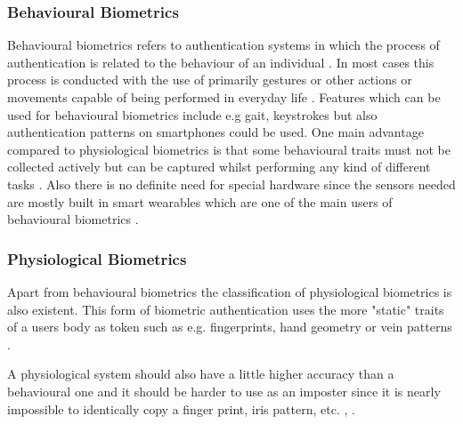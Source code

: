 \subsubsection{Behavioural Biometrics}
Behavioural biometrics refers to authentication systems in which the process of authentication is related to the behaviour of an individual \cite{bhattacharyya2009biometric}.
In most cases this process is conducted with the use of primarily gestures or other actions or movements capable of being performed in everyday life \cite{yampolskiy2008behavioural}.
Features which can be used for behavioural biometrics include e.g gait, keystrokes but also authentication patterns on smartphones could be used.
One main advantage compared to physiological biometrics is that some behavioural traits must not be collected actively but can be captured whilst performing any kind of different tasks \cite{yampolskiy2008behavioural}. 
Also there is no definite need for special hardware since the sensors needed are mostly built in smart wearables which are one of the main users of behavioural biometrics \cite{johnston2015smartwatch}.

\subsubsection{Physiological Biometrics}
Apart from behavioural biometrics the classification of physiological biometrics is also existent. 
This form of biometric authentication uses the more "static" traits of a users body as token such as e.g. fingerprints, hand geometry \cite{alsaadi2015physiological} or vein patterns \cite{faltaous2019vpid}.

A physiological system should also have a little higher accuracy than a behavioural one and it should be harder to use as an imposter since it is nearly impossible to identically copy a finger print, iris pattern, etc. \cite{koong2014user}, \cite{delac2004survey}.

